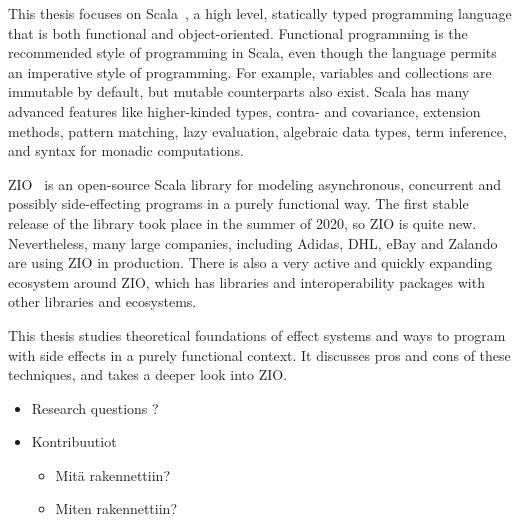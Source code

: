 This thesis focuses on Scala~\cite{scala}, a high level, statically typed programming language that is both functional and object-oriented. Functional programming is the recommended style of programming in Scala, even though the language permits an imperative style of programming. For example, variables and collections are immutable by default, but mutable counterparts also exist. Scala has many advanced features like higher-kinded types, contra- and covariance, extension methods, pattern matching, lazy evaluation, algebraic data types, term inference, and syntax for monadic computations.

ZIO~\cite{zio} is an open-source Scala library for modeling asynchronous, concurrent and possibly side-effecting programs in a purely functional way. The first stable release of the library took place in the summer of 2020, so ZIO is quite new. Nevertheless, many large companies, including Adidas, DHL, eBay and Zalando are using ZIO in production. There is also a very active and quickly expanding ecosystem around ZIO, which has libraries and interoperability packages with other libraries and ecosystems.

This thesis studies theoretical foundations of effect systems and ways to program with side effects in a purely functional context. It discusses pros and cons of these techniques, and takes a deeper look into ZIO. 


\begin{itemize}
    \item Research questions ?

    \item Kontribuutiot
    \begin{itemize}
        \item Mitä rakennettiin?
        \item Miten rakennettiin?
    \end{itemize}
\end{itemize}

